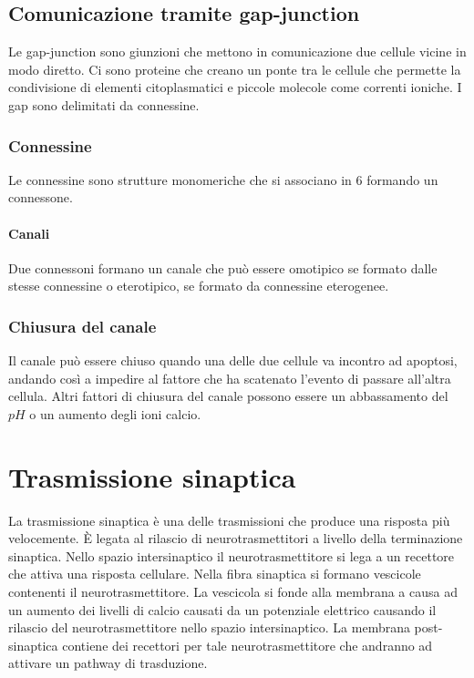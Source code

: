 	\subsection{Comunicazione tramite gap-junction}
	Le gap-junction sono giunzioni che mettono in comunicazione due cellule vicine in modo diretto.
	Ci sono proteine che creano un ponte tra le cellule che permette la condivisione di elementi citoplasmatici e piccole molecole come correnti ioniche.
	I gap sono delimitati da connessine.

		\subsubsection{Connessine}
		Le connessine sono strutture monomeriche che si associano in $6$ formando un connessone.

			\paragraph{Canali}
			Due connessoni formano un canale che pu\`o essere omotipico se formato dalle stesse connessine o eterotipico, se formato da connessine eterogenee.

		\subsubsection{Chiusura del canale}
		Il canale pu\`o essere chiuso quando una delle due cellule va incontro ad apoptosi, andando cos\`i a impedire al fattore che ha scatenato l'evento di passare all'altra cellula.
		Altri fattori di chiusura del canale possono essere un abbassamento del $pH$ o un aumento degli ioni calcio.

\section{Trasmissione sinaptica}
La trasmissione sinaptica \`e una delle trasmissioni che produce una risposta pi\`u velocemente.
\`E legata al rilascio di neurotrasmettitori a livello della terminazione sinaptica.
Nello spazio intersinaptico il neurotrasmettitore si lega a un recettore che attiva una risposta cellulare.
Nella fibra sinaptica si formano vescicole contenenti il neurotrasmettitore.
La vescicola si fonde alla membrana a causa ad un aumento dei livelli di calcio causati da un potenziale elettrico causando il rilascio del neurotrasmettitore nello spazio intersinaptico.
La membrana post-sinaptica contiene dei recettori per tale neurotrasmettitore che andranno ad attivare un pathway di trasduzione.

